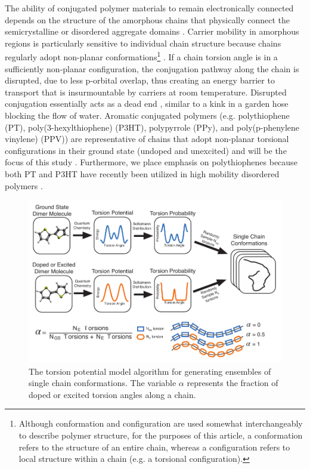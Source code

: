The ability of conjugated polymer materials to remain electronically connected depends on the structure of the amorphous chains that physically connect the semicrystalline or disordered aggregate domains \cite{Noriega2013}. Carrier mobility in amorphous regions is particularly sensitive to individual chain structure because chains regularly adopt non-planar conformations\footnote[2]{Although conformation and configuration are used somewhat interchangeably to describe polymer structure, for the purposes of this article, a conformation refers to the structure of an entire chain, whereas a configuration refers to local structure within a chain (e.g. a torsional configuration).} \cite{Noriega2013a}. If a chain torsion angle is in a sufficiently non-planar configuration\footnotemark[2], the conjugation pathway along the chain is disrupted, due to less p-orbital overlap, thus creating an energy barrier to transport that is insurmountable by carriers at room temperature. Disrupted conjugation essentially acts as a dead end \cite{Son2016}, similar to a kink in a garden hose blocking the flow of water. Aromatic conjugated polymers (e.g. polythiophene (PT), poly(3-hexylthiophene) (P3HT), polypyrrole (PPy), and poly(p-phenylene vinylene) (PPV)) are representative of chains that adopt non-planar torsional configurations in their ground state (undoped and unexcited) and will be the focus of this study \cite{Dubay2012, Fonner2010, Kofranek1992, Mao1993}. Furthermore, we place emphasis on polythiophenes because both PT and P3HT have recently been utilized in high mobility disordered polymers \cite{Son2016, Zhang2010}.

\begin{figure}[hbt!]
  \includegraphics{figures/chap2/methods_diagram.pdf}
  \caption[Algorithm of the Torsion Potential Model]{The torsion potential model algorithm for generating ensembles of single chain conformations. The variable $\alpha$ represents the fraction of doped or excited torsion angles along a chain.}
  \label{fig:TPM}
\end{figure}

